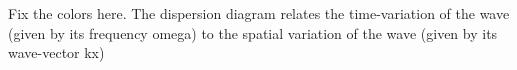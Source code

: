 \documentclass[a4paper,titlepage,onecolumn]{report}
\let\oldsqrt\sqrt
\def\sqrt{\mathpalette\DHLhksqrt}
\def\DHLhksqrt#1#2{%
\setbox0=\hbox{$#1\oldsqrt{#2\,}$}\dimen0=\ht0
\advance\dimen0-0.2\ht0
\setbox2=\hbox{\vrule height\ht0 depth -\dimen0}%
{\box0\lower0.4pt\box2}}
\begin{document}
%
%
%
%
%
%
%
%
%
%
%
Fix the colors here.
The dispersion diagram relates the time-variation of the wave (given by its
frequency omega) to the spatial variation of the wave (given by its
wave-vector kx)
\end{document}
